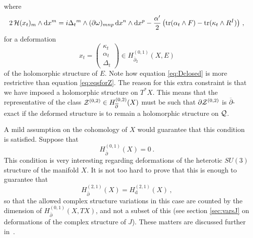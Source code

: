 \documentclass[12pt,a4paper]{article}
\def\bar#1{\overline{#1}}
\let\p=\partial
\def\d{\textrm{d}}
\def\bp{\bar{\partial}}
\def\tr{\textrm{tr}}
\theoremstyle{definition}
\begin{document}
where
\[ 2\, {\cal H}(x_t)_m\wedge\d x^m = i \Delta_t{}^m \wedge (\p\omega)_{mnp}\, \d x^n\wedge \d x^p
- \frac{\alpha'}{2}\, \big(\tr(\alpha_t\wedge F) - \tr(\kappa_t\wedge R^I)\big)~,\]
for a deformation
\begin{equation*}
x_t=\left(
\begin{array}{c}
\kappa_t \\ \alpha_t\\ \Delta_t
\end{array}
\right)
\in H_{\bp_2}^{(0,1)}(X,E)
\end{equation*} 
of the holomorphic structure of $E$. Note how equation \eqref{eq:Dclosed} is more restrictive than equation \eqref{eq:eqsforZ}.   The reason for this extra constraint is that we have imposed a holomorphic structure on $T^*X$.  This means that the representative of the class
${\cal Z}^{(0,2)}\in H_{\bp}^{(0,2)}(X)$  must be such that
$\p{\cal Z}^{(0,2)}$ is $\bp$-exact if the deformed structure is to remain a holomorphic structure on $\cal Q$. 

A mild assumption on the cohomology of $X$ would guarantee that this condition is satisfied.  Suppose that
\begin{equation}
 H_{\bp}^{(0,1)}(X) = 0~.\label{eq:novectors}
 \end{equation}
This condition is very  interesting regarding deformations of the heterotic $SU(3)$ structure of the manifold $X$. 
It is not too hard to prove that this  is enough to guarantee that
\begin{equation*}
H_{\bp}^{(2,1)}(X)=H^{(2,1)}_{\d}(X)\:,
\end{equation*}
so that the allowed complex structure variations in this case are counted by the dimension of $H^{(0,1)}_{\bp}(X,TX)$, and not a subset of this (see section \ref{sec:varsJ} on deformations of the complex structure of $J$).  These matters are discussed further in~\citep{DKS2014}.
\end{document}
